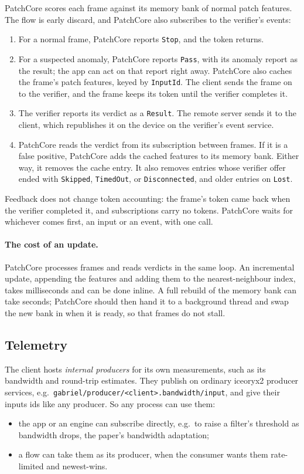 \documentclass[11pt]{article}
\newcommand{\code}[1]{\texttt{#1}}
\begin{document}
PatchCore scores each frame against its memory bank of normal patch features.
The flow is early discard, and PatchCore also subscribes to the verifier's
events:
\begin{enumerate}[nosep]
  \item For a normal frame, PatchCore reports \code{Stop}, and the token
        returns.
  \item For a suspected anomaly, PatchCore reports \code{Pass}, with its
        anomaly report as the result; the app can act on that report right
        away. PatchCore also caches the frame's patch features, keyed by
        \code{InputId}. The client sends the frame on to the verifier, and the
        frame keeps its token until the verifier completes it.
  \item The verifier reports its verdict as a \code{Result}. The remote server
        sends it to the client, which republishes it on the device on the
        verifier's event service.
  \item PatchCore reads the verdict from its subscription between frames. If
        it is a false positive, PatchCore adds the cached features to its
        memory bank. Either way, it removes the cache entry. It also removes
        entries whose verifier offer ended with \code{Skipped},
        \code{TimedOut}, or \code{Disconnected}, and older entries on
        \code{Lost}.
\end{enumerate}
Feedback does not change token accounting: the frame's token came back when
the verifier completed it, and subscriptions carry no tokens. PatchCore waits
for whichever comes first, an input or an event, with one call.

\paragraph{The cost of an update.} PatchCore processes frames and reads
verdicts in the same loop. An incremental update, appending the features and
adding them to the nearest-neighbour index, takes milliseconds and can be done
inline. A full rebuild of the memory bank can take seconds; PatchCore should
then hand it to a background thread and swap the new bank in when it is ready,
so that frames do not stall.

\subsection{Telemetry}
\label{sec:telemetry}

The client hosts \emph{internal producers} for its own measurements, such as
its bandwidth and round-trip estimates. They publish on ordinary iceoryx2
producer services, e.g.\ \nolinkurl{gabriel/producer/<client>.bandwidth/input},
and give their inputs ids like any producer. So any process can use them:
\begin{itemize}[nosep]
  \item the app or an engine can subscribe directly, e.g.\ to raise a filter's
        threshold as bandwidth drops, the paper's bandwidth adaptation;
  \item a flow can take them as its producer, when the consumer wants them
        rate-limited and newest-wins.
\end{itemize}
\end{document}
